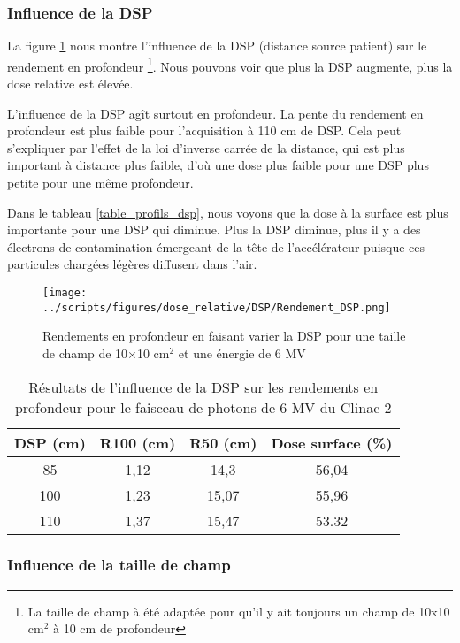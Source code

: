 \documentclass{article}
\begin{document}
\subsubsection{Influence de la DSP}

La figure \ref*{fig_rdt_dsp} nous montre l'influence de la DSP (distance source patient) sur le rendement en profondeur \footnote{La taille de champ à été adaptée pour qu'il y ait toujours un champ de 10x10 cm$^2$ à 10 cm de profondeur}. Nous pouvons voir que plus la DSP augmente, plus la dose relative est élevée.

L'influence de la DSP agît surtout en profondeur. La pente du rendement en profondeur est plus faible pour l'acquisition à 110 cm de DSP. Cela peut s'expliquer par l'effet de la loi d'inverse carrée de la distance, qui est plus important à distance plus faible, d'où une dose plus faible pour une DSP plus petite pour une même profondeur. 

Dans le tableau \ref*{table_profils_dsp}, nous voyons que la dose à la surface est plus importante pour une DSP qui diminue. Plus la DSP diminue, plus il y a des électrons de contamination émergeant de la tête de l'accélérateur puisque ces particules chargées légères diffusent dans l'air.

\begin{figure}[h]
  \centering
  \texttt{[image: ../scripts/figures/dose\_relative/DSP/Rendement\_DSP.png]}
  \caption{Rendements en profondeur en faisant varier la DSP pour une taille de champ de 10$\times$10 cm$^2$ et une énergie de 6 MV}
  \label{fig_rdt_dsp}
\end{figure}

\begin{table}[h]
  \centering
  \begin{tabular}{cccc}
    \toprule
    \textbf{DSP (cm)} & \textbf{R100 (cm)} & \textbf{R50 (cm)} & \textbf{Dose surface (\%)} \\
    \toprule
    85 & 1,12 & 14,3 & 56,04 \\
    100 & 1,23 & 15,07 & 55,96 \\
    110 & 1,37 & 15,47 & 53.32 \\
    \bottomrule
  \end{tabular}
  \caption{Résultats de l'influence de la DSP sur les rendements en profondeur pour le faisceau de photons de 6 MV du Clinac 2}
  \label{table_rdt_dsp}
\end{table}

\subsubsection{Influence de la taille de champ}
\end{document}
